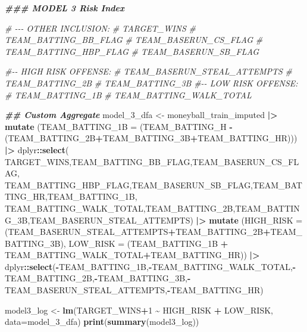 \documentclass[
]{article}
\newenvironment{Shaded}{\begin{snugshade}}{\end{snugshade}}
\newcommand{\AttributeTok}[1]{\textcolor[rgb]{0.13,0.29,0.53}{#1}}
\newcommand{\CommentTok}[1]{\textcolor[rgb]{0.56,0.35,0.01}{\textit{#1}}}
\newcommand{\DecValTok}[1]{\textcolor[rgb]{0.00,0.00,0.81}{#1}}
\newcommand{\DocumentationTok}[1]{\textcolor[rgb]{0.56,0.35,0.01}{\textbf{\textit{#1}}}}
\newcommand{\FunctionTok}[1]{\textcolor[rgb]{0.13,0.29,0.53}{\textbf{#1}}}
\newcommand{\NormalTok}[1]{#1}
\newcommand{\OtherTok}[1]{\textcolor[rgb]{0.56,0.35,0.01}{#1}}
\newcommand{\SpecialCharTok}[1]{\textcolor[rgb]{0.81,0.36,0.00}{\textbf{#1}}}
\begin{document}
\begin{Shaded}
\begin{Highlighting}[]
\DocumentationTok{\#\#\# MODEL 3 Risk Index}

\CommentTok{\# {-}{-}{-} OTHER INCLUSION: }
\CommentTok{\#     TARGET\_WINS}
\CommentTok{\#     TEAM\_BATTING\_BB\_FLAG}
\CommentTok{\#     TEAM\_BASERUN\_CS\_FLAG}
\CommentTok{\#     TEAM\_BATTING\_HBP\_FLAG}
\CommentTok{\#     TEAM\_BASERUN\_SB\_FLAG}

\CommentTok{\#{-}{-} HIGH RISK OFFENSE:}
\CommentTok{\#     TEAM\_BASERUN\_STEAL\_ATTEMPTS}
\CommentTok{\#     TEAM\_BATTING\_2B}
\CommentTok{\#     TEAM\_BATTING\_3B}
\CommentTok{\#{-}{-} LOW RISK OFFENSE:}
\CommentTok{\#     TEAM\_BATTING\_1B}
\CommentTok{\#     TEAM\_BATTING\_WALK\_TOTAL}

\DocumentationTok{\#\# Custom Aggregate}
\NormalTok{model\_3\_dfa }\OtherTok{\textless{}{-}}\NormalTok{ moneyball\_train\_imputed }\SpecialCharTok{|\textgreater{}}
  \FunctionTok{mutate}\NormalTok{ (}\AttributeTok{TEAM\_BATTING\_1B =}\NormalTok{ (TEAM\_BATTING\_H }\SpecialCharTok{{-}}\NormalTok{ (TEAM\_BATTING\_2B}\SpecialCharTok{+}\NormalTok{TEAM\_BATTING\_3B}\SpecialCharTok{+}\NormalTok{TEAM\_BATTING\_HR))) }\SpecialCharTok{|\textgreater{}}
\NormalTok{  dplyr}\SpecialCharTok{::}\FunctionTok{select}\NormalTok{( TARGET\_WINS,TEAM\_BATTING\_BB\_FLAG,TEAM\_BASERUN\_CS\_FLAG, TEAM\_BATTING\_HBP\_FLAG,TEAM\_BASERUN\_SB\_FLAG,TEAM\_BATTING\_HR,TEAM\_BATTING\_1B,}
\NormalTok{          TEAM\_BATTING\_WALK\_TOTAL,TEAM\_BATTING\_2B,TEAM\_BATTING\_3B,TEAM\_BASERUN\_STEAL\_ATTEMPTS) }\SpecialCharTok{|\textgreater{}}
  \FunctionTok{mutate}\NormalTok{ (}\AttributeTok{HIGH\_RISK =}\NormalTok{   (TEAM\_BASERUN\_STEAL\_ATTEMPTS}\SpecialCharTok{+}\NormalTok{TEAM\_BATTING\_2B}\SpecialCharTok{+}\NormalTok{TEAM\_BATTING\_3B),}
          \AttributeTok{LOW\_RISK =}\NormalTok{ (TEAM\_BATTING\_1B }\SpecialCharTok{+}\NormalTok{ TEAM\_BATTING\_WALK\_TOTAL}\SpecialCharTok{+}\NormalTok{TEAM\_BATTING\_HR)) }\SpecialCharTok{|\textgreater{}}
\NormalTok{  dplyr}\SpecialCharTok{::}\FunctionTok{select}\NormalTok{(}\SpecialCharTok{{-}}\NormalTok{TEAM\_BATTING\_1B,}\SpecialCharTok{{-}}\NormalTok{TEAM\_BATTING\_WALK\_TOTAL,}\SpecialCharTok{{-}}\NormalTok{TEAM\_BATTING\_2B,}\SpecialCharTok{{-}}\NormalTok{TEAM\_BATTING\_3B,}\SpecialCharTok{{-}}\NormalTok{TEAM\_BASERUN\_STEAL\_ATTEMPTS,}\SpecialCharTok{{-}}\NormalTok{TEAM\_BATTING\_HR)}

\NormalTok{model3\_log }\OtherTok{\textless{}{-}} \FunctionTok{lm}\NormalTok{(TARGET\_WINS}\SpecialCharTok{+}\DecValTok{1} \SpecialCharTok{\textasciitilde{}}\NormalTok{ HIGH\_RISK }\SpecialCharTok{+}\NormalTok{ LOW\_RISK, }\AttributeTok{data=}\NormalTok{model\_3\_dfa)}
\FunctionTok{print}\NormalTok{(}\FunctionTok{summary}\NormalTok{(model3\_log))}
\end{Highlighting}
\end{Shaded}
\end{document}
